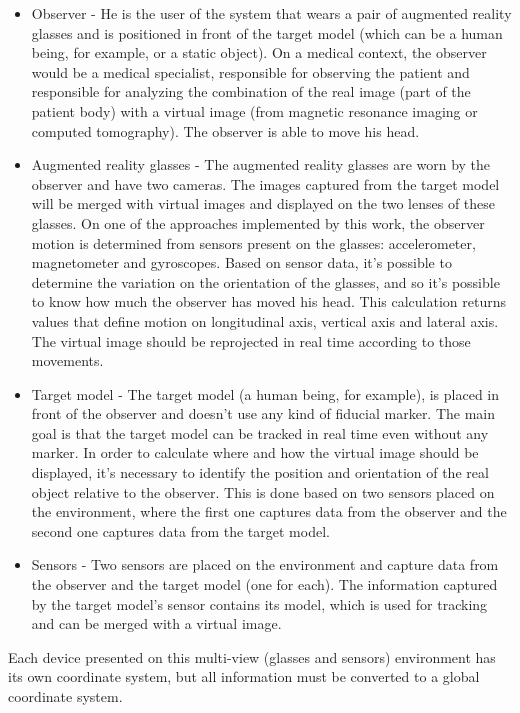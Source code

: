 \documentclass[msc, a4paper, classic, en]{ufbathesis}
\begin{document}
\begin{itemize}
  \item Observer - He is the user of the system that wears a pair of augmented reality glasses and is positioned in front of the target model (which can be a human being, for example, or a static object). On a medical context, the observer would be a medical specialist, responsible for observing the patient and responsible for analyzing the combination of the real image (part of the patient body) with a virtual image (from magnetic resonance imaging or computed tomography). The observer is able to move his head.
  \item Augmented reality glasses - The augmented reality glasses are worn by the observer and have two cameras. The images captured from the target model will be merged with virtual images and displayed on the two lenses of these glasses. On one of the approaches implemented by this work, the observer motion is determined from sensors present on the glasses: accelerometer, magnetometer and gyroscopes. Based on sensor data, it's possible to determine the variation on the orientation of the glasses, and so it's possible to know how much the observer has moved his head. This calculation returns values that define motion on longitudinal axis, vertical axis and lateral axis. The virtual image should be reprojected in real time according to those movements.
  \item Target model - The target model (a human being, for example), is placed in front of the observer and doesn't use any kind of fiducial marker. The main goal is that the target model can be tracked in real time even without any marker. In order to calculate where and how the virtual image should be displayed, it's necessary to identify the position and orientation of the real object relative to the observer. This is done based on two sensors placed on the environment, where the first one captures data from the observer and the second one captures data from the target model.
  \item Sensors - Two sensors are placed on the environment and capture data from the observer and the target model (one for each). The information captured by the target model's sensor contains its model, which is used for tracking and can be merged with a virtual image.
\end{itemize}

Each device presented on this multi-view (glasses and sensors) environment has its own coordinate system, but all information must be converted to a global coordinate system.
\end{document}
